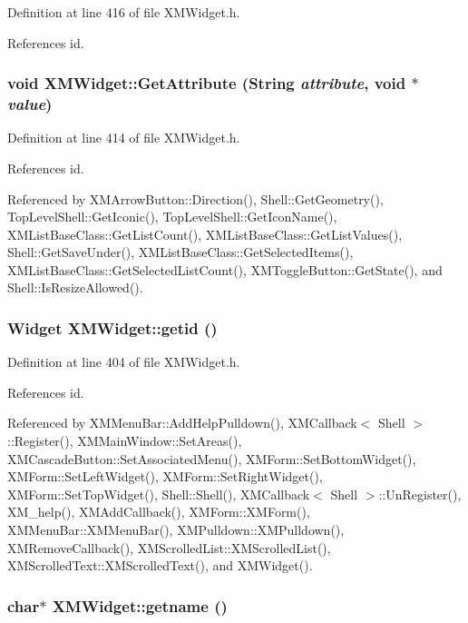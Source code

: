 Definition at line 416 of file XMWidget.h.

References id.
\subsubsection{\setlength{\rightskip}{0pt plus 5cm}void XMWidget::Get\-Attribute (String {\em attribute}, void $\ast$ {\em value})\hspace{0.3cm}{\tt  [inline]}}\label{classXMWidget_a11}




Definition at line 414 of file XMWidget.h.

References id.

Referenced by XMArrow\-Button::Direction(), Shell::Get\-Geometry(), Top\-Level\-Shell::Get\-Iconic(), Top\-Level\-Shell::Get\-Icon\-Name(), XMList\-Base\-Class::Get\-List\-Count(), XMList\-Base\-Class::Get\-List\-Values(), Shell::Get\-Save\-Under(), XMList\-Base\-Class::Get\-Selected\-Items(), XMList\-Base\-Class::Get\-Selected\-List\-Count(), XMToggle\-Button::Get\-State(), and Shell::Is\-Resize\-Allowed().
\subsubsection{\setlength{\rightskip}{0pt plus 5cm}Widget XMWidget::getid ()\hspace{0.3cm}{\tt  [inline]}}\label{classXMWidget_a6}




Definition at line 404 of file XMWidget.h.

References id.

Referenced by XMMenu\-Bar::Add\-Help\-Pulldown(), XMCallback$<$ Shell $>$::Register(), XMMain\-Window::Set\-Areas(), XMCascade\-Button::Set\-Associated\-Menu(), XMForm::Set\-Bottom\-Widget(), XMForm::Set\-Left\-Widget(), XMForm::Set\-Right\-Widget(), XMForm::Set\-Top\-Widget(), Shell::Shell(), XMCallback$<$ Shell $>$::Un\-Register(), XM\_\-help(), XMAdd\-Callback(), XMForm::XMForm(), XMMenu\-Bar::XMMenu\-Bar(), XMPulldown::XMPulldown(), XMRemove\-Callback(), XMScrolled\-List::XMScrolled\-List(), XMScrolled\-Text::XMScrolled\-Text(), and XMWidget().
\subsubsection{\setlength{\rightskip}{0pt plus 5cm}char$\ast$ XMWidget::getname ()\hspace{0.3cm}{\tt  [inline]}}\label{classXMWidget_a8}




